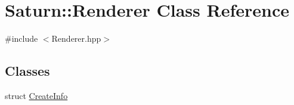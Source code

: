 \hypertarget{class_saturn_1_1_renderer}{}\section{Saturn\+:\+:Renderer Class Reference}
\label{class_saturn_1_1_renderer}


{\ttfamily \#include $<$Renderer.\+hpp$>$}

\subsection*{Classes}
\begin{DoxyCompactItemize}
\item 
struct \mbox{\hyperlink{struct_saturn_1_1_renderer_1_1_create_info}{Create\+Info}}
\end{DoxyCompactItemize}
